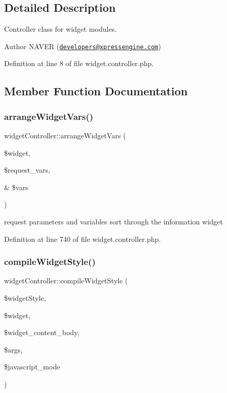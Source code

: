 \subsection{Detailed Description}
Controller class for widget modules. 

\begin{DoxyAuthor}{Author}
N\+A\+V\+ER (\href{mailto:developers@xpressengine.com}{\tt developers@xpressengine.\+com}) 
\end{DoxyAuthor}


Definition at line 8 of file widget.\+controller.\+php.



\subsection{Member Function Documentation}
\hypertarget{classwidgetController_a7f852fc1f0b521ff574f85ee067173ce}{}\label{classwidgetController_a7f852fc1f0b521ff574f85ee067173ce} 
\subsubsection{\texorpdfstring{arrange\+Widget\+Vars()}{arrangeWidgetVars()}}
{\footnotesize\ttfamily widget\+Controller\+::arrange\+Widget\+Vars (\begin{DoxyParamCaption}\item[{}]{\$widget,  }\item[{}]{\$request\+\_\+vars,  }\item[{\&}]{\$vars }\end{DoxyParamCaption})}



request parameters and variables sort through the information widget 



Definition at line 740 of file widget.\+controller.\+php.

\hypertarget{classwidgetController_ad399f4e9088de6b63e479bfd68c1f2a0}{}\label{classwidgetController_ad399f4e9088de6b63e479bfd68c1f2a0} 
\subsubsection{\texorpdfstring{compile\+Widget\+Style()}{compileWidgetStyle()}}
{\footnotesize\ttfamily widget\+Controller\+::compile\+Widget\+Style (\begin{DoxyParamCaption}\item[{}]{\$widget\+Style,  }\item[{}]{\$widget,  }\item[{}]{\$widget\+\_\+content\+\_\+body,  }\item[{}]{\$args,  }\item[{}]{\$javascript\+\_\+mode }\end{DoxyParamCaption})}



